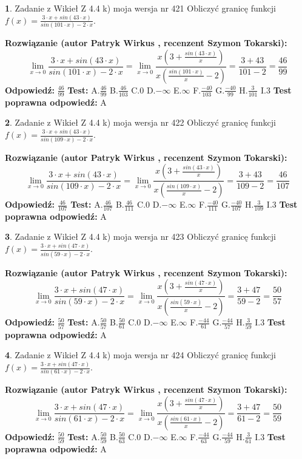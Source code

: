 \documentclass[12pt, a4paper]{article}
\theoremstyle{definition} %
\newtheorem{zad}{}
\newcommand{\zadStart}[1]{\begin{zad}#1\newline}
\newcommand{\zadStop}{\end{zad}}
\newcommand{\rozwStart}[2]{\noindent \textbf{Rozwiązanie (autor #1 , recenzent #2): }\newline}
\newcommand{\rozwStop}{\newline}
\newcommand{\odpStart}{\noindent \textbf{Odpowiedź:}\newline}
\newcommand{\odpStop}{\newline}
\newcommand{\testStart}{\noindent \textbf{Test:}\newline}
\newcommand{\testStop}{\newline}
\newcommand{\kluczStart}{\noindent \textbf{Test poprawna odpowiedź:}\newline}
\newcommand{\kluczStop}{\newline}
\begin{document}
\zadStart{Zadanie z Wikieł Z 4.4 k) moja wersja nr 421}
Obliczyć granicę funkcji $f(x)=\frac{3\cdot x +sin(43\cdot x)}{sin(101\cdot x) -2\cdot x}$.
\zadStop
\rozwStart{Patryk Wirkus}{Szymon Tokarski}
$$\lim\limits_{x\to 0}\frac{3\cdot x +sin(43\cdot x)}{sin(101\cdot x) -2\cdot x}
=\lim\limits_{x\to 0}\frac{x(3+\frac{sin(43\cdot x)}{x})}{x(\frac{sin(101\cdot x)}{x}-2)}
=\frac{3+43}{101-2} = \frac{46}{99}$$
\rozwStop
\odpStart
$\frac{46}{99}$
\odpStop
\testStart
A.$\frac{46}{99}$
B.$\frac{46}{103}$
C.$0$
D.$-\infty$
E.$\infty$
F.$\frac{-40}{103}$
G.$\frac{-40}{99}$
H.$\frac{3}{101}$
I.$3$
\testStop
\kluczStart
A
\kluczStop



\zadStart{Zadanie z Wikieł Z 4.4 k) moja wersja nr 422}
Obliczyć granicę funkcji $f(x)=\frac{3\cdot x +sin(43\cdot x)}{sin(109\cdot x) -2\cdot x}$.
\zadStop
\rozwStart{Patryk Wirkus}{Szymon Tokarski}
$$\lim\limits_{x\to 0}\frac{3\cdot x +sin(43\cdot x)}{sin(109\cdot x) -2\cdot x}
=\lim\limits_{x\to 0}\frac{x(3+\frac{sin(43\cdot x)}{x})}{x(\frac{sin(109\cdot x)}{x}-2)}
=\frac{3+43}{109-2} = \frac{46}{107}$$
\rozwStop
\odpStart
$\frac{46}{107}$
\odpStop
\testStart
A.$\frac{46}{107}$
B.$\frac{46}{111}$
C.$0$
D.$-\infty$
E.$\infty$
F.$\frac{-40}{111}$
G.$\frac{-40}{107}$
H.$\frac{3}{109}$
I.$3$
\testStop
\kluczStart
A
\kluczStop



\zadStart{Zadanie z Wikieł Z 4.4 k) moja wersja nr 423}
Obliczyć granicę funkcji $f(x)=\frac{3\cdot x +sin(47\cdot x)}{sin(59\cdot x) -2\cdot x}$.
\zadStop
\rozwStart{Patryk Wirkus}{Szymon Tokarski}
$$\lim\limits_{x\to 0}\frac{3\cdot x +sin(47\cdot x)}{sin(59\cdot x) -2\cdot x}
=\lim\limits_{x\to 0}\frac{x(3+\frac{sin(47\cdot x)}{x})}{x(\frac{sin(59\cdot x)}{x}-2)}
=\frac{3+47}{59-2} = \frac{50}{57}$$
\rozwStop
\odpStart
$\frac{50}{57}$
\odpStop
\testStart
A.$\frac{50}{57}$
B.$\frac{50}{61}$
C.$0$
D.$-\infty$
E.$\infty$
F.$\frac{-44}{61}$
G.$\frac{-44}{57}$
H.$\frac{3}{59}$
I.$3$
\testStop
\kluczStart
A
\kluczStop



\zadStart{Zadanie z Wikieł Z 4.4 k) moja wersja nr 424}
Obliczyć granicę funkcji $f(x)=\frac{3\cdot x +sin(47\cdot x)}{sin(61\cdot x) -2\cdot x}$.
\zadStop
\rozwStart{Patryk Wirkus}{Szymon Tokarski}
$$\lim\limits_{x\to 0}\frac{3\cdot x +sin(47\cdot x)}{sin(61\cdot x) -2\cdot x}
=\lim\limits_{x\to 0}\frac{x(3+\frac{sin(47\cdot x)}{x})}{x(\frac{sin(61\cdot x)}{x}-2)}
=\frac{3+47}{61-2} = \frac{50}{59}$$
\rozwStop
\odpStart
$\frac{50}{59}$
\odpStop
\testStart
A.$\frac{50}{59}$
B.$\frac{50}{63}$
C.$0$
D.$-\infty$
E.$\infty$
F.$\frac{-44}{63}$
G.$\frac{-44}{59}$
H.$\frac{3}{61}$
I.$3$
\testStop
\kluczStart
A
\kluczStop
\end{document}
